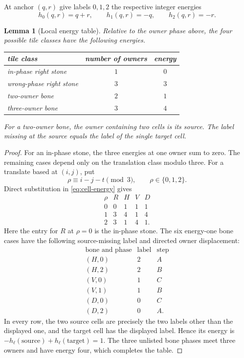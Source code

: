 \documentclass[11pt]{amsart}
\newtheorem{lemma}[theorem]{Lemma}
\theoremstyle{definition}
\begin{document}
At anchor $(q,r)$ give labels $0,1,2$ the respective integer energies
\begin{equation}\label{eq:cell-energy}
 h_0(q,r)=q+r,\qquad h_1(q,r)=-q,\qquad h_2(q,r)=-r.
\end{equation}

\begin{lemma}[Local energy table]\label{lem:energy-table}
Relative to the owner phase above, the four possible tile classes have the
following energies.
\begin{center}
\begin{tabular}{lcc}
\toprule
tile class & number of owners & energy\\
\midrule
in-phase right stone & $1$ & $0$\\
wrong-phase right stone & $3$ & $3$\\
two-owner bone & $2$ & $1$\\
three-owner bone & $3$ & $4$\\
\bottomrule
\end{tabular}
\end{center}
For a two-owner bone, the owner containing two cells is its source.  The label
missing at the source equals the label of the single target cell.
\end{lemma}

\begin{proof}
For an in-phase stone, the three energies at one owner sum to zero.  The
remaining cases depend only on the translation class modulo three.  For a
translate based at $(i,j)$, put
\[
 \rho\equiv i-j-t\pmod3,\qquad \rho\in\{0,1,2\}.
\]
Direct substitution in \eqref{eq:cell-energy} gives
\[
\begin{array}{c|cccc}
\rho& R&H&V&D\\ \hline
0&0&1&1&1\\
1&3&4&1&4\\
2&3&1&4&1.
\end{array}
\]
Here the entry for $R$ at $\rho=0$ is the in-phase stone.  The six
energy-one bone cases have the following source-missing label and directed
owner displacement:
\[
\begin{array}{c|cc}
\text{bone and phase}&\text{label}&\text{step}\\ \hline
(H,0)&2&A\\
(H,2)&2&B\\
(V,0)&1&C\\
(V,1)&1&B\\
(D,0)&0&C\\
(D,2)&0&A.
\end{array}
\]
In every row, the two source cells are precisely the two labels other than
the displayed one, and the target cell has the displayed label.  Hence its
energy is $-h_\ell(\text{source})+h_\ell(\text{target})=1$.  The three
unlisted bone phases meet three owners and have energy four, which completes
the table.
\end{proof}
\end{document}
